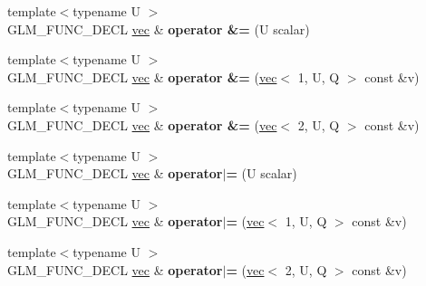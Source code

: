 \begin{DoxyCompactItemize}
{\footnotesize template$<$typename U $>$ }\\G\+L\+M\+\_\+\+F\+U\+N\+C\+\_\+\+D\+E\+CL \hyperlink{structglm_1_1vec}{vec} \& {\bfseries operator \&=} (U scalar)
\item 
\mbox{\label{structglm_1_1vec_3_012_00_01T_00_01Q_01_4_a0f1cfa1940438903f605b620a928ce38}} 
{\footnotesize template$<$typename U $>$ }\\G\+L\+M\+\_\+\+F\+U\+N\+C\+\_\+\+D\+E\+CL \hyperlink{structglm_1_1vec}{vec} \& {\bfseries operator \&=} (\hyperlink{structglm_1_1vec}{vec}$<$ 1, U, Q $>$ const \&v)
\item 
\mbox{\label{structglm_1_1vec_3_012_00_01T_00_01Q_01_4_a09a49ab5d55622ad568b054276c84786}} 
{\footnotesize template$<$typename U $>$ }\\G\+L\+M\+\_\+\+F\+U\+N\+C\+\_\+\+D\+E\+CL \hyperlink{structglm_1_1vec}{vec} \& {\bfseries operator \&=} (\hyperlink{structglm_1_1vec}{vec}$<$ 2, U, Q $>$ const \&v)
\item 
\mbox{\label{structglm_1_1vec_3_012_00_01T_00_01Q_01_4_a6f02d011da89c44a43c8ff139bafe9fa}} 
{\footnotesize template$<$typename U $>$ }\\G\+L\+M\+\_\+\+F\+U\+N\+C\+\_\+\+D\+E\+CL \hyperlink{structglm_1_1vec}{vec} \& {\bfseries operator$\vert$=} (U scalar)
\item 
\mbox{\label{structglm_1_1vec_3_012_00_01T_00_01Q_01_4_aa5a9bdd476d4095d33cd04662df20fcb}} 
{\footnotesize template$<$typename U $>$ }\\G\+L\+M\+\_\+\+F\+U\+N\+C\+\_\+\+D\+E\+CL \hyperlink{structglm_1_1vec}{vec} \& {\bfseries operator$\vert$=} (\hyperlink{structglm_1_1vec}{vec}$<$ 1, U, Q $>$ const \&v)
\item 
\mbox{\label{structglm_1_1vec_3_012_00_01T_00_01Q_01_4_ad50a7c0287c528e30aa091dd98595452}} 
{\footnotesize template$<$typename U $>$ }\\G\+L\+M\+\_\+\+F\+U\+N\+C\+\_\+\+D\+E\+CL \hyperlink{structglm_1_1vec}{vec} \& {\bfseries operator$\vert$=} (\hyperlink{structglm_1_1vec}{vec}$<$ 2, U, Q $>$ const \&v)
\item 
\mbox{\label{structglm_1_1vec_3_012_00_01T_00_01Q_01_4_af112affb46b25559da949c6247850d8d}} 

\end{DoxyCompactItemize}
